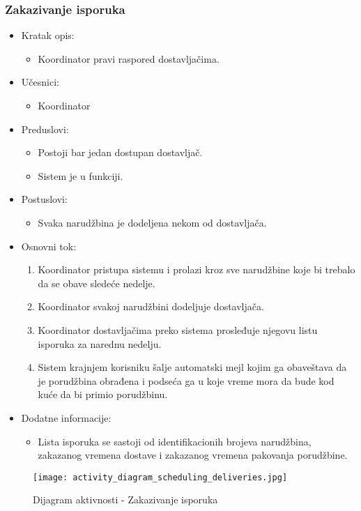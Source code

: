 
\subsubsection{Zakazivanje isporuka}

\begin{itemize}
	\item Kratak opis:
		\begin{itemize}
			\item Koordinator pravi raspored dostavljačima.
		\end{itemize}
	\item Učesnici:
		\begin{itemize}
		    \item Koordinator
		\end{itemize}
	\item Preduslovi:
		\begin{itemize}
		    \item Postoji bar jedan dostupan dostavljač.
		    \item Sistem je u funkciji.
		\end{itemize}
	\item Postuslovi:
		\begin{itemize}
			\item Svaka narudžbina je dodeljena nekom od dostavljača.
	\end{itemize}
	\item Osnovni tok:
		\begin{enumerate}
            \item Koordinator pristupa sistemu i prolazi kroz sve narudžbine koje bi trebalo da se obave sledeće nedelje.
           \item Koordinator svakoj narudžbini dodeljuje dostavljača.
            \item Koordinator dostavljačima preko sistema prosleđuje njegovu listu isporuka za narednu nedelju.
            \item Sistem krajnjem korisniku šalje automatski mejl kojim ga obaveštava da je porudžbina obrađena i podseća  ga u koje vreme mora da bude kod kuće da bi primio porudžbinu.
		\end{enumerate}
   \item Dodatne informacije:
        \begin{itemize}
            \item Lista isporuka se sastoji od identifikacionih brojeva narudžbina, zakazanog vremena dostave i zakazanog vremena pakovanja porudžbine. 
        \end{itemize}
\end{itemize}

\begin{figure}[H]
\begin{center}
\texttt{[image: activity\_diagram\_scheduling\_deliveries.jpg]}
\end{center}
    \caption{Dijagram aktivnosti - Zakazivanje isporuka}
\label{fig:Activity_diagram_scheduling_deliveries}
\end{figure}

